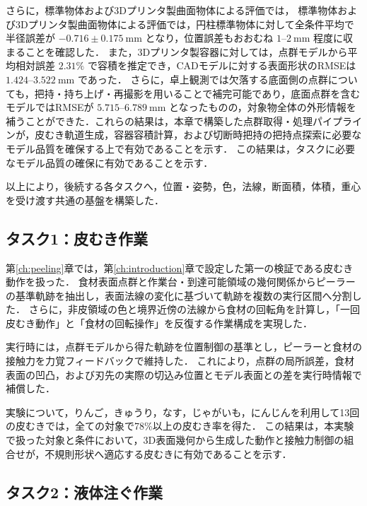 さらに，標準物体および3Dプリンタ製曲面物体による評価では，
標準物体および3Dプリンタ製曲面物体による評価では，円柱標準物体に対して全条件平均で半径誤差が $-0.716 \pm 0.175~\mathrm{mm}$ となり，位置誤差もおおむね $1$--$2~\mathrm{mm}$ 程度に収まることを確認した．
また，3Dプリンタ製容器に対しては，点群モデルから平均相対誤差 $2.31\%$ で容積を推定でき，CADモデルに対する表面形状のRMSEは $1.424$--$3.522~\mathrm{mm}$ であった．
さらに，卓上観測では欠落する底面側の点群についても，把持・持ち上げ・再撮影を用いることで補完可能であり，底面点群を含むモデルではRMSEが $5.715$--$6.789~\mathrm{mm}$ となったものの，対象物全体の外形情報を補うことができた．これらの結果は，本章で構築した点群取得・処理パイプラインが，皮むき軌道生成，容器容積計算，および切断時把持の把持点探索に必要なモデル品質を確保する上で有効であることを示す．
この結果は，タスクに必要なモデル品質の確保に有効であることを示す．

以上により，後続する各タスクへ，位置・姿勢，色，法線，断面積，体積，重心を受け渡す共通の基盤を構築した．

\subsection{タスク1：皮むき作業}
\label{subsec:conclusion_peeling}

第\ref{ch:peeling}章では，第\ref{ch:introduction}章で設定した第一の検証である皮むき動作を扱った．
食材表面点群と作業台・到達可能領域の幾何関係からピーラーの基準軌跡を抽出し，表面法線の変化に基づいて軌跡を複数の実行区間へ分割した．
さらに，非皮領域の色と境界近傍の法線から食材の回転角を計算し，「一回皮むき動作」と「食材の回転操作」を反復する作業構成を実現した．

実行時には，点群モデルから得た軌跡を位置制御の基準とし，ピーラーと食材の接触力を力覚フィードバックで維持した．
これにより，点群の局所誤差，食材表面の凹凸，および刃先の実際の切込み位置とモデル表面との差を実行時情報で補償した．

実験について，りんご，きゅうり，なす，じゃがいも，にんじんを利用して13回の皮むきでは，全ての対象で78\%以上の皮むき率を得た．
この結果は，本実験で扱った対象と条件において，3D表面幾何から生成した動作と接触力制御の組合せが，不規則形状へ適応する皮むきに有効であることを示す．

\subsection{タスク2：液体注ぐ作業}
\label{subsec:conclusion_pouring}


